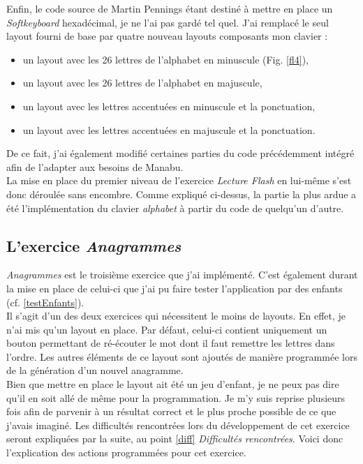 Enfin, le code source de Martin Pennings étant destiné à mettre en place un \textit{Softkeyboard} hexadécimal, je ne l'ai pas gardé tel quel. J'ai remplacé le seul layout fourni de base par quatre nouveau layouts composants mon clavier :
\begin{itemize}
\item un layout avec les 26 lettres de l'alphabet en minuscule (Fig. \ref{fl4}),
\item un layout avec les 26 lettres de l'alphabet en majuscule,
\item un layout avec les lettres accentuées en minuscule et la ponctuation,
\item un layout avec les lettres accentuées en majuscule et la ponctuation.
\end{itemize}
De ce fait, j'ai également modifié certaines parties du code précédemment intégré afin de l'adapter aux besoins de Manabu.\\

La mise en place du premier niveau de l'exercice \textit{Lecture Flash} en lui-même s'est donc déroulée sans encombre. Comme expliqué ci-dessus, la partie la plus ardue a été l'implémentation du clavier \textit{alphabet} à partir du code de quelqu'un d'autre.
	
\subsection{L'exercice \textit{Anagrammes}}
\textit{Anagrammes} est le troisième exercice que j'ai implémenté. C'est également durant la mise en place de celui-ci que j'ai pu faire tester l'application par des enfants (cf. \ref{testEnfants}).\\

Il s'agit d'un des deux exercices qui nécessitent le moins de layouts. En effet, je n'ai mis qu'un layout en place. Par défaut, celui-ci contient uniquement un bouton permettant de ré-écouter le mot dont il faut remettre les lettres dans l'ordre. Les autres éléments de ce layout sont ajoutés de manière programmée lors de la génération d'un nouvel anagramme.\\

Bien que mettre en place le layout ait été un jeu d'enfant, je ne peux pas dire qu'il en soit allé de même pour la programmation. Je m'y suis reprise plusieurs fois afin de parvenir à un résultat correct et le plus proche possible de ce que j'avais imaginé. Les difficultés rencontrées lors du développement de cet exercice seront expliquées par la suite, au point \ref{diff} \textit{Difficultés rencontrées}. Voici donc l'explication des actions programmées pour cet exercice.\\

